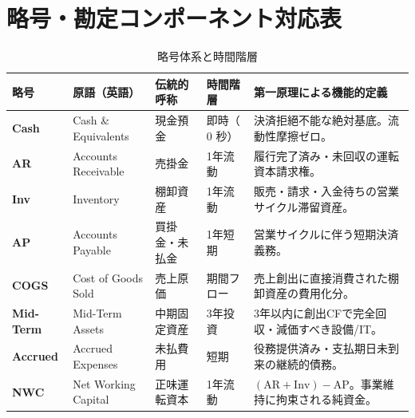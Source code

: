 \section{略号・勘定コンポーネント対応表}
\begin{table}[htbp]
\centering
\small
\begin{tabular}{llllp{6.8cm}}
\toprule
\textbf{略号} & \textbf{原語（英語）} & \textbf{伝統的呼称} & \textbf{時間階層} & \textbf{第一原理による機能的定義} \\
\midrule
\textbf{Cash} & Cash \& Equivalents & 現金預金 & 即時（$0$ 秒） & 決済拒絕不能な絶対基底。流動性摩擦ゼロ。 \\
\textbf{AR} & Accounts Receivable & 売掛金 & 1年流動 & 履行完了済み・未回収の運転資本請求権。 \\
\textbf{Inv} & Inventory & 棚卸資産 & 1年流動 & 販売・請求・入金待ちの営業サイクル滞留資産。 \\
\textbf{AP} & Accounts Payable & 買掛金・未払金 & 1年短期 & 営業サイクルに伴う短期決済義務。 \\
\textbf{COGS} & Cost of Goods Sold & 売上原価 & 期間フロー & 売上創出に直接消費された棚卸資産の費用化分。 \\
\textbf{Mid-Term} & Mid-Term Assets & 中期固定資産 & 3年投資 & 3年以内に創出CFで完全回収・減価すべき設備/IT。 \\
\textbf{Accrued} & Accrued Expenses & 未払費用 & 短期 & 役務提供済み・支払期日未到来の継続的債務。 \\
\textbf{NWC} & Net Working Capital & 正味運転資本 & 1年流動 & $(\text{AR} + \text{Inv}) - \text{AP}$。事業維持に拘束される純資金。 \\
\bottomrule
\end{tabular}
\caption{略号体系と時間階層}
\end{table}

